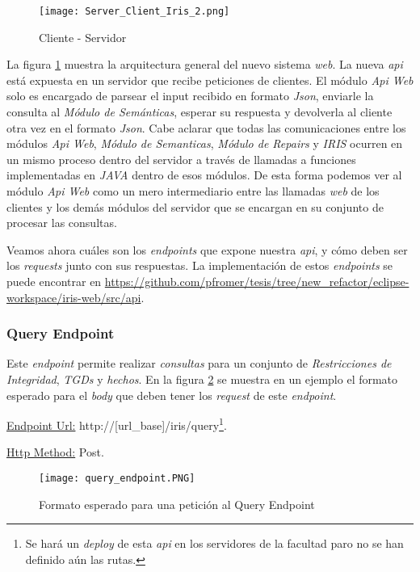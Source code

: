 \documentclass[11pt,a4paper,twoside]{tesis}
\begin{document}
\begin{figure}[ht]
    \texttt{[image: Server\_Client\_Iris\_2.png]}
    \centering
    \caption{Cliente - Servidor}
    \label{fig:server_client}
\end{figure}

La figura \ref{fig:server_client} muestra la arquitectura general del nuevo sistema \textit{web}. La nueva \textit{api} está expuesta en un servidor que recibe peticiones de clientes. El módulo \textit{Api Web} solo es encargado de parsear el input recibido en formato \textit{Json}, enviarle la consulta al \textit{Módulo de Semánticas}, esperar su respuesta y devolverla al cliente otra vez en el formato \textit{Json}. Cabe aclarar que todas las comunicaciones entre los módulos \textit{Api Web}, \textit{Módulo de Semanticas}, \textit{Módulo de Repairs} y \textit{IRIS} ocurren en un mismo proceso dentro del servidor a través de llamadas a funciones implementadas en \textit{JAVA} dentro de esos módulos. De esta forma podemos ver al módulo \textit{Api Web} como un mero intermediario entre las llamadas \textit{web} de los clientes y los demás módulos del servidor que se encargan en su conjunto de procesar las consultas.

Veamos ahora cuáles son los \textit{endpoints} que expone nuestra \textit{api}, y cómo 
deben ser los \textit{requests} junto con sus respuestas. La implementación de estos \textit{endpoints} se puede encontrar en \url{https://github.com/pfromer/tesis/tree/new_refactor/eclipse-workspace/iris-web/src/api}. 

\subsubsection{Query Endpoint}\label{query_enpoint_section}

Este \textit{endpoint} permite realizar \textit{consultas} para un conjunto de \textit{Restricciones de Integridad}, \textit{TGDs} y \textit{hechos}. En la figura \ref{fig:query_endpoint} se muestra en un ejemplo el formato esperado para el \textit{body} que deben tener los \textit{request} de este \textit{endpoint}.

\underline{Endpoint Url:} http://[url\_base]/iris/query\footnote{Se hará un \textit{deploy} de esta \textit{api} en los servidores de la facultad paro no se han definido aún las rutas.}.

\underline{Http Method:} Post.


\begin{figure}[ht]
    \texttt{[image: query\_endpoint.PNG]}
    \centering
    \caption{Formato esperado para una petición al Query Endpoint}
    \label{fig:query_endpoint}
\end{figure}
\end{document}
